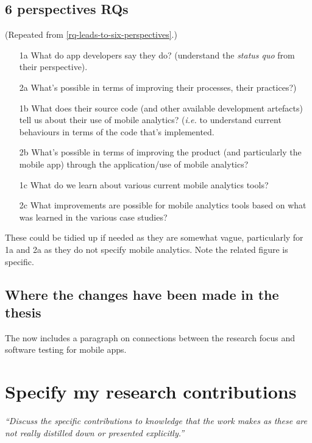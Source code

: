 \subsection{6 perspectives RQs}
(Repeated from \ref{rq-leads-to-six-perspectives}.)

\begin{kaobox}[frametitle=The six perspectives from Chapter 1]
\begin{enumerate}
    \item [1a] What do app developers say they do? (understand the \emph{status quo} from their perspective).
    \item [2a] What's possible in terms of improving their processes, their practices?)
    \item [1b] What does their source code (and other available development artefacts) tell us about their use of mobile analytics? (\emph{i.e.} to understand current behaviours in terms of the code that's implemented.
    \item [2b] What's possible in terms of improving the product (and particularly the mobile app) through the application/use of mobile analytics?
    \item [1c] What do we learn about various current mobile analytics tools?
    \item [2c] What improvements are possible for mobile analytics tools based on what was learned in the various case studies?
\end{enumerate}    
\end{kaobox}

These could be tidied up if needed as they are somewhat vague, particularly 
 for 1a and 2a as they do not specify mobile analytics. Note the related figure is specific.

\subsection{Where the changes have been made in the thesis}
The  now includes a paragraph on connections between the research 
 focus and software testing for  mobile apps.

\section{Specify my research contributions}
\emph{``Discuss the specific contributions to knowledge that the work makes as these are not really distilled down or presented explicitly.''}

